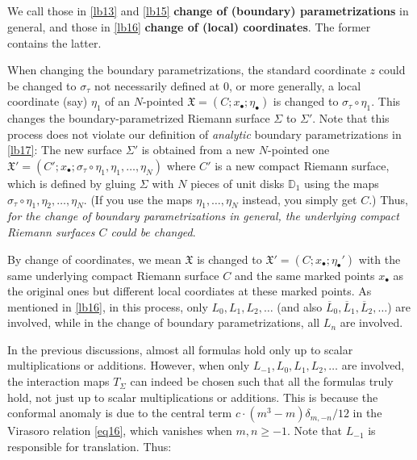 \documentclass[12pt,a4paper,notitlepage]{article}
\theoremstyle{definition}
\theoremstyle{plain}
\newcommand{\fk}{\mathfrak}
\newcommand{\ovl}{\overline}
\newcommand{\blt}{\bullet}
\newcommand{\Dbb}{\mathbb D}
\numberwithin{equation}{section}
\begin{document}
\subsection{}


We call those in \ref{lb13} and \ref{lb15} \textbf{change of (boundary) parametrizations} in general, and those in \ref{lb16} \textbf{change of (local) coordinates}. The former contains the latter. 

When changing the boundary parametrizations, the standard coordinate $z$ could be changed to $\sigma_\tau$ not necessarily  defined at $0$, or more generally, a local coordinate (say) $\eta_1$ of an $N$-pointed $\fk X=(C;x_\blt;\eta_\blt)$ is changed to $\sigma_\tau\circ\eta_1$. This changes the boundary-parametrized Riemann surface $\Sigma$ to $\Sigma'$. Note that this process does not violate our definition of \emph{analytic} boundary parametrizations in \ref{lb17}: The new surface $\Sigma'$ is obtained from a new $N$-pointed one $\fk X'=(C';x_\blt;\sigma_\tau\circ\eta_1,\eta_1,\dots,\eta_N)$ where $C'$ is a new compact Riemann surface, which is defined by gluing $\Sigma$ with $N$ pieces of unit  disks $\Dbb_1$ using the maps $\sigma_\tau\circ\eta_1,\eta_2,\dots,\eta_N$. (If you use the maps $\eta_1,\dots,\eta_N$ instead, you simply get $C$.) Thus, \emph{for the change of boundary parametrizations in general, the underlying compact Riemann surfaces $C$ could be changed}.

By change of coordinates, we mean $\fk X$ is changed to $\fk X'=(C;x_\blt;\eta_\blt')$ with the same underlying compact Riemann surface $C$ and the same marked points $x_\blt$ as the original ones but different local coordiates at these marked points. As mentioned in \ref{lb16}, in this process, only $L_0,L_1,L_2,\dots$ (and also $\ovl L_0,\ovl L_1,\ovl L_2,\dots$) are involved, while in the change of boundary parametrizations, all $L_n$ are involved. 



In the previous discussions, almost all formulas hold only up to scalar multiplications or additions. However, when only $L_{-1}, L_0, L_1, L_2,\dots$ are involved, the interaction maps $T_\Sigma$ can indeed be chosen such that all the formulas truly hold, not just up to scalar multiplications or additions. This is because the conformal anomaly is due to the central term $c\cdot (m^3-m)\delta_{m,-n}/12$ in the Virasoro relation \eqref{eq16}, which vanishes when $m,n\geq -1$. Note that $L_{-1}$ is responsible for translation. Thus:
\end{document}
